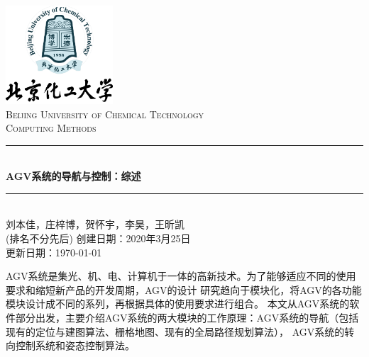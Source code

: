 \documentclass[cs4size,a4paper]{ctexart}
\numberwithin{equation}{section}
\numberwithin{table}{section}
\numberwithin{figure}{section}
\newcommand{\HRule}{\rule{\linewidth}{0.5mm}}
\begin{document}
\newtheorem{example}{例}              	%
\newtheorem{algorithem}{算法}	
\newtheorem{theorem}{定理}            	%
\newtheorem{definition}{定义}
\newtheorem{axiom}{公理}
\newtheorem{property}{性质}
\newtheorem{proposition}{命题}
\newtheorem{lemma}{引理}
\newtheorem{corollary}{推论}
\newtheorem{remark}{注解}
\newtheorem{condition}{条件}
\newtheorem{conclusion}{结论}
\newtheorem{assumption}{假设}
\renewcommand{\contentsname}{目录}     
\renewcommand{\abstractname}{摘要} 
\renewcommand{\refname}{参考文献}     
\renewcommand{\indexname}{索引}
\renewcommand{\figurename}{图}
\renewcommand{\tablename}{表}
\renewcommand{\appendixname}{附录}
\renewcommand{\proofname}{证明}
\renewcommand\emph[1]{\textcolor{black}{\textbf{#1}}}
\begin{titlepage}
\begin{center}
\includegraphics[width=0.30\textwidth]{logo}\\[1cm]    
\textsc{\Large Beijing University of Chemical Technology}\\[1.0cm]
\textsc{\Large Computing Methods}\\[0.5cm]
\HRule \\[0.8cm]
{\huge \bfseries AGV系统的导航与控制：综述}\\[0.4cm]
\HRule \\[0.7cm]
\textsc{刘本佳，庄梓博，贺怀宇，李昊，王昕凯\\(排名不分先后)}
\tableofcontents 
\vfill
{创建日期：2020年3月25日}\\
{更新日期：\today}
\end{center}
\end{titlepage}
\pagestyle{plain}
\thispagestyle{empty}
\pagestyle{fancy}

\abstract
AGV系统是集光、机、电、计算机于一体的高新技术。为了能够适应不同的使用要求和缩短新产品的开发周期，AGV的设计
研究趋向于模块化，将AGV的各功能模块设计成不同的系列，再根据具体的使用要求进行组合。
本文从AGV系统的软件部分出发，主要介绍AGV系统的两大模块的工作原理：AGV系统的导航（包括现有的定位与建图算法、栅格地图、现有的全局路径规划算法），
AGV系统的转向控制系统和姿态控制算法。
\end{document}
